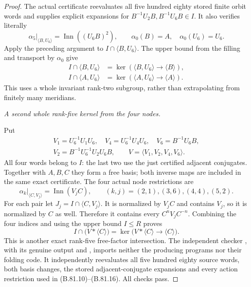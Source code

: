 \begin{proof}
The actual certificate  reevaluates all
five hundred eighty stored finite orbit words and supplies explicit
expansions for
\(B^{-1}U_2B,B^{-1}U_6B\in I\). It also verifies literally
\[
 \alpha_5|_{\langle B,U_6\rangle}
       =\operatorname{Inn}((U_6B)^2),\qquad
 \alpha_0(B)=A,\quad\alpha_0(U_6)=U_6.
 \tag{B.81.12}
\]
Apply the preceding argument to \(I\cap\langle B,U_6\rangle\).
The upper bound from the filling and transport by \(\alpha_0\) give
\[
\begin{split}
 I\cap\langle B,U_6\rangle
       &=\ker(\langle B,U_6\rangle\to\langle B\rangle),\\
 I\cap\langle A,U_6\rangle
       &=\ker(\langle A,U_6\rangle\to\langle A\rangle).
\end{split}
 \tag{B.81.13}
\]
This uses a whole invariant rank-two subgroup, rather than extrapolating
from finitely many meridians.

\emph{A second whole rank-five kernel from the four nodes.}\par
Put
\[
 \begin{gathered}
 V_1=U_6^{-1}U_1U_6,\quad V_4=U_6^{-1}U_4U_6,\quad V_6=B^{-1}U_6B,\\
 V_2=B^{-1}U_6^{-1}U_2U_6B,\qquad
 V=\langle V_1,V_2,V_4,V_6\rangle.
 \end{gathered}
 \tag{B.81.14}
\]
All four words belong to \(I\): the last two use the just certified
adjacent conjugates. Together with \(A,B,C\) they form a free basis;
both inverse maps are included in the same exact certificate.
The four actual node restrictions are
\[
 \alpha_k|_{\langle C,V_j\rangle}
       =\operatorname{Inn}(V_jC),\qquad
        (k,j)=(2,1),(3,6),(4,4),(5,2).
 \tag{B.81.15}
\]
For each pair let \(J_j=I\cap\langle C,V_j\rangle\).
It is normalized by \(V_jC\) and contains \(V_j\), so it is
normalized by \(C\) as well. Therefore it contains every
\(C^nV_jC^{-n}\). Combining the four indices and using the upper
bound \(I\leq R\) proves
\[
 I\cap\bigl(V*\langle C\rangle\bigr)
       =\ker\bigl(V*\langle C\rangle\longrightarrow\langle C\rangle\bigr).
 \tag{B.81.16}
\]
This is another exact rank-five free-factor intersection. The independent
checker , with its genuine
output and , imports
neither the producing programs nor their folding code. It independently
reevaluates all five hundred eighty source words, both basis changes,
the stored adjacent-conjugate expansions and every action restriction
used in (B.81.10)--(B.81.16). All checks pass.


\end{proof}
